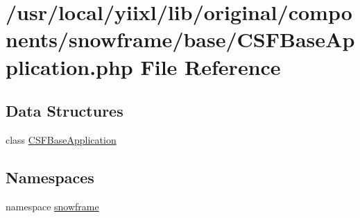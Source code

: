 \hypertarget{CSFBaseApplication_8php}{
\section{/usr/local/yiixl/lib/original/components/snowframe/base/CSFBaseApplication.php File Reference}
\label{CSFBaseApplication_8php}
}
\subsection*{Data Structures}
\begin{DoxyCompactItemize}
\item 
class \hyperlink{classCSFBaseApplication}{CSFBaseApplication}
\end{DoxyCompactItemize}
\subsection*{Namespaces}
\begin{DoxyCompactItemize}
\item 
namespace \hyperlink{namespacesnowframe}{snowframe}
\end{DoxyCompactItemize}
